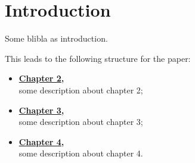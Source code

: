 
\chapter{Introduction}
\label{chap:intro}

Some blibla as introduction. \autocite{batchuComparativeStudyEqual2022}

This leads to the following structure for the paper: 
\begin{itemize}
    \item \textbf{\hyperref[chap:fundamentals]{Chapter 2},}\\
    some description about chapter 2;
    \item \textbf{\hyperref[chap:methods]{Chapter 3},}\\
    some description about chapter 3;
    \item \textbf{\hyperref[chap:results]{Chapter 4},}\\
    some description about chapter 4.
\end{itemize}